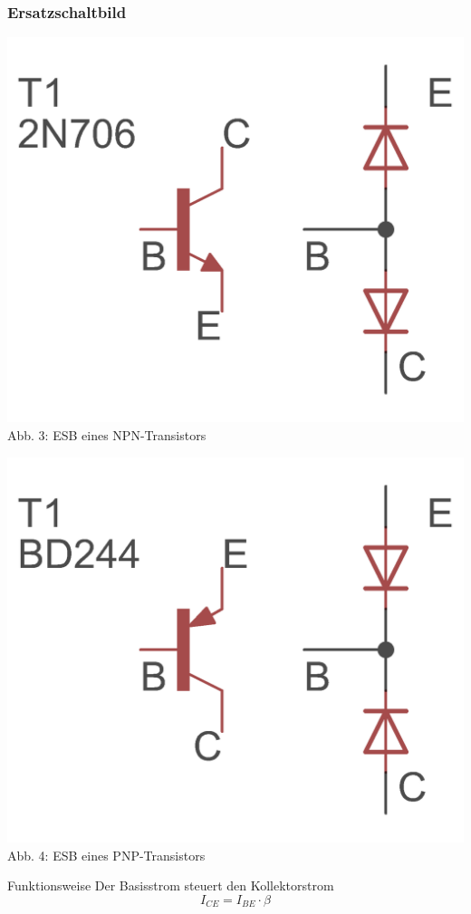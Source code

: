 \begin{frame}
\frametitle{Ersatzschaltbild}

\begin{minipage}{0.4\textwidth}
	\includegraphics[scale=1.4]{e13/NPN_esb.png}\\
	Abb. 3: ESB eines NPN-Transistors
\end{minipage}
\hspace{0.5cm}
\begin{minipage}{0.4\textwidth}
	\includegraphics[scale=1.4]{e13/PNP_esb.png}\\
	Abb. 4: ESB eines PNP-Transistors
\end{minipage}

\begin{center}
\begin{block}{Funktionsweise}
Der Basisstrom steuert den Kollektorstrom
$$I_{CE} = I_{BE} \cdot \beta$$
\end{block}
\end{center}

\end{frame}


